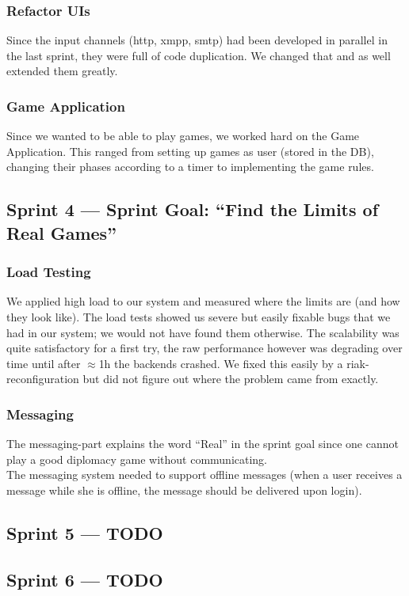 \documentclass[11pt,a4paper]{report}
\begin{document}
\subsubsection{Refactor UIs}
Since the input channels (http, xmpp, smtp) had been developed in parallel in
the last sprint, they were full of code duplication. We changed that and as well
extended them greatly.
\subsubsection{Game Application}
Since we wanted to be able to play games, we worked hard on the Game
Application. This ranged from setting up games as user (stored in the DB),
changing their phases according to a timer to implementing the game rules.

\subsection*{Sprint 4 --- Sprint Goal: ``Find the Limits of Real Games''}
\subsubsection{Load Testing}
We applied high load to our system and measured where the limits are (and how
they look like). The load tests showed us severe but easily fixable bugs that
we had in our system; we would not have found them otherwise. The scalability
was quite satisfactory for a first try, the raw performance however was
degrading over time until after $\approx$1h the backends crashed. We fixed this
easily by a riak-reconfiguration but did not figure out where the problem came
from exactly.

\subsubsection{Messaging}
The messaging-part explains the word ``Real'' in the sprint goal since one
cannot play a good diplomacy game without communicating.\\
The messaging system needed to support offline messages (when a user receives a
message while she is offline, the message should be delivered upon login).

\subsection*{Sprint 5 --- TODO}
\subsection*{Sprint 6 --- TODO}
\end{document}

